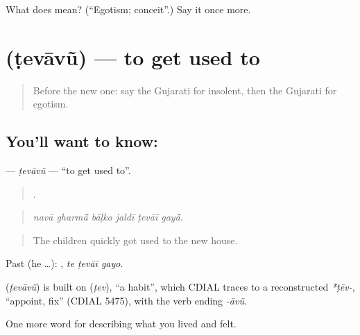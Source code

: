 \begin{tcolorbox}[breakable,colback=teal!4,colframe=teal!35!black,title={Before you move on}]
What does  mean? (\textquotedblleft{}Egotism; conceit\textquotedblright{}.) Say it once more.
\end{tcolorbox}
\section[\texorpdfstring{\gu{ટેવાવું} (ṭevāvũ)}{ટેવાવું (ṭevāvũ)}]{ (ṭevāvũ) — to get used to}

\label{lesson:GU-C465-tevavu}



\begin{quote}
Before the new one: say the Gujarati for insolent, then the Gujarati for egotism.
\end{quote}

\subsection*{You'll want to know: }
\textbf{} — \emph{ṭevāvũ} — \textquotedblleft{}to get used to\textquotedblright{}.

\begin{quote}
     .
\end{quote}

\begin{quote}
\emph{navā gharmā̃ bāḷko jaldī ṭevāī gayā̃.}
\end{quote}

\begin{quote}
The children quickly got used to the new house.
\end{quote}

Past (he …):   , \emph{te ṭevāī gayo}.

\begin{cousinweb}
\textbf{} (\emph{ṭevāvũ}) is built on \textbf{} (\emph{ṭev}), \textquotedblleft{}a habit\textquotedblright{}, which CDIAL traces to a reconstructed \emph{*ṭēv-}, \textquotedblleft{}appoint, fix\textquotedblright{} (CDIAL 5475), with the verb ending \emph{-āvũ}.
\end{cousinweb}

\begin{grammarlens}[title={What you've built}]
One more word for describing what you lived and felt.
\end{grammarlens}

